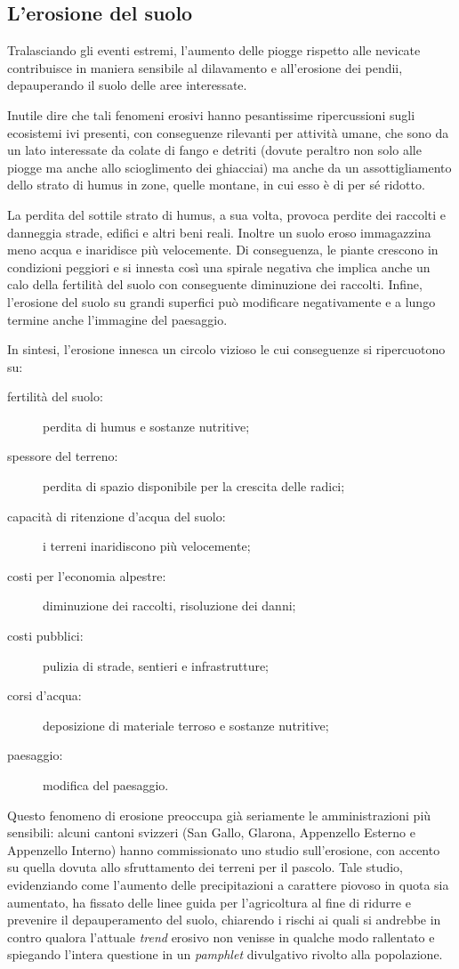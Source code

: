 \documentclass[14pt,a4paper]{article}
\begin{document}
	\subsection{L'erosione del suolo}
	Tralasciando gli eventi estremi, l'aumento delle piogge rispetto alle nevicate contribuisce in maniera sensibile al dilavamento e all'erosione dei pendii, depauperando il suolo delle aree interessate.
	
	Inutile dire che tali fenomeni erosivi hanno pesantissime ripercussioni sugli ecosistemi ivi presenti, con conseguenze rilevanti per attività umane, che sono da un lato interessate da colate di fango e detriti (dovute peraltro non solo alle piogge ma anche allo scioglimento dei ghiacciai) ma anche da un assottigliamento dello strato di humus in zone, quelle montane, in cui esso è di per sé ridotto.
	
	La perdita del sottile strato di humus, a sua volta, provoca perdite dei raccolti e danneggia strade, edifici e altri beni reali. Inoltre un suolo eroso immagazzina meno acqua e inaridisce più velocemente. Di conseguenza, le piante crescono in condizioni peggiori e si innesta così una spirale negativa che implica anche un calo della fertilità del suolo con conseguente diminuzione dei raccolti. Infine, l'erosione del suolo su grandi superfici può modificare negativamente e a lungo termine anche l'immagine del paesaggio.
	 	
	In sintesi, l'erosione innesca un circolo vizioso le cui conseguenze si ripercuotono su:
	
	\begin{description}
		\item[fertilità del suolo:]
		perdita di humus e sostanze nutritive;
		\item[spessore del terreno:]
		perdita di spazio disponibile per la crescita delle radici;
		\item[capacità di ritenzione d'acqua del suolo:]
		i terreni inaridiscono più velocemente;
		\item[costi per l'economia alpestre:]
		diminuzione dei raccolti, risoluzione dei danni;
		\item[costi pubblici:]
		pulizia di strade, sentieri e infrastrutture;
		\item[corsi d'acqua:]
		deposizione di materiale terroso e sostanze nutritive;
		\item[paesaggio:]
		modifica del paesaggio.
	\end{description}
		
	Questo fenomeno di erosione preoccupa già seriamente le amministrazioni più sensibili: alcuni cantoni svizzeri (San Gallo, Glarona, Appenzello Esterno e Appenzello Interno) hanno commissionato uno studio \cite{Bodenerosion_2016-07-07} sull'erosione, con accento su quella dovuta allo sfruttamento dei terreni per il pascolo. Tale studio, evidenziando come l'aumento delle precipitazioni a carattere piovoso in quota sia aumentato, ha fissato delle linee guida per l'agricoltura al fine di ridurre e prevenire il depauperamento del suolo, chiarendo i rischi ai quali si andrebbe in contro qualora l'attuale \textit{trend} erosivo non venisse in qualche modo rallentato e spiegando l'intera questione in un \textit{pamphlet} divulgativo rivolto alla popolazione.
	
\end{document}
